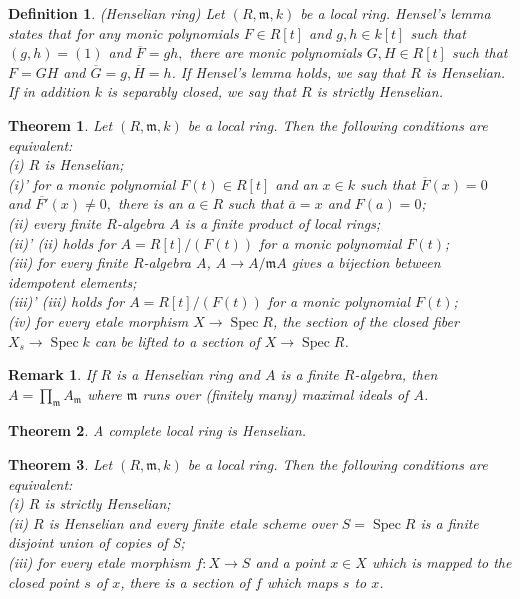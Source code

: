 \documentclass{article}
\theoremstyle{theorem}
\newtheorem*{definition*}{Definition}
\newtheorem{theorem}{Theorem}[section]
\newtheorem{remark}{Remark}[section]
\begin{document}
    
    \begin{definition*} (Henselian ring)
        Let $(R, \mathfrak{m}, k)$ be a local ring. Hensel's lemma states that for any monic polynomials $F \in R[t]$ and $g, h \in k[t]$ such that $(g, h) = (1)$ and $\overline{F} = gh,$ there are monic polynomials $G, H \in R[t]$ such that $F = GH$ and $\overline{G} = g, \overline{H} = h$. If Hensel's lemma holds, we say that $R$ is Henselian. If in addition $k$ is separably closed, we say that $R$ is strictly Henselian.
    \end{definition*}
    
    \begin{theorem}
        Let $(R, \mathfrak{m}, k)$ be a local ring. Then the following conditions are equivalent:\\
        {\rm (i)} $R$ is Henselian;\\
        {\rm (i)'} for a monic polynomial $F(t) \in R[t]$ and an $x \in k$ such that $\overline{F}(x) = 0$ and $\overline{F'}(x) \neq 0,$ there is an $a \in R$ such that $\overline{a} = x$ and $F(a) = 0$;\\
        {\rm (ii)} every finite $R$-algebra $A$ is a finite product of local rings;\\
        {\rm (ii)'} {\rm (ii)} holds for $A = R[t]/(F(t))$ for a monic polynomial $F(t)$;\\
        {\rm (iii)} for every finite $R$-algebra $A$, $A \rightarrow A/\mathfrak{m}A$ gives a bijection between idempotent elements;\\
        {\rm (iii)'} {\rm (iii)} holds for $A = R[t]/(F(t))$ for a monic polynomial $F(t)$;\\
        {\rm (iv)} for every etale morphism $X \rightarrow \operatorname{Spec} R$, the section of the closed fiber $X_s \rightarrow \operatorname{Spec} k$ can be lifted to a section of $X \rightarrow \operatorname{Spec} R$.
    \end{theorem}
    
    \begin{remark}
        If $R$ is a Henselian ring and $A$ is a finite $R$-algebra, then $A = \prod_{\mathfrak m} A_{\mathfrak m}$ where $\mathfrak m$ runs over (finitely many) maximal ideals of $A$.
    \end{remark}
    
    \begin{theorem}
        A complete local ring is Henselian.
    \end{theorem}
    
    \begin{theorem}
        Let $(R, \mathfrak{m}, k)$ be a local ring. Then the following conditions are equivalent:\\
        {\rm (i)} $R$ is strictly Henselian;\\
        {\rm (ii)} $R$ is Henselian and every finite etale scheme over $S = \operatorname{Spec} R$ is a finite disjoint union of copies of S;\\
        {\rm (iii)} for every etale morphism $f : X \rightarrow S$ and a point $x \in X$ which is mapped to the closed point $s$ of $x$, there is a section of $f$ which maps $s$ to $x$.
    \end{theorem} 
    
\end{document}
